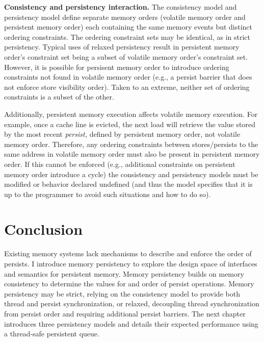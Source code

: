 \textbf{Consistency and persistency interaction.}
The consistency model and persistency model define separate memory orders (volatile memory order and persistent memory order) each containing the same memory events but distinct ordering constraints.
The ordering constraint sets may be identical, as in strict persistency.
Typical uses of relaxed persistency result in persistent memory order's constraint set being a subset of volatile memory order's constraint set.
However, it is possible for persisent memory order to introduce ordering constraints not found in volatile memory order (e.g., a persist barrier that does not enforce store visibility order).
Taken to an extreme, neither set of ordering constraints is a subset of the other.

Additionally, persistent memory execution affects volatile memory execution.
For example, once a cache line is evicted, the next load will retrieve the value stored by the most recent \emph{persist,} defined by persistent memory order, not volatile memory order.
Therefore, any ordering constraints between stores/persists to the same address in volatile memory order must also be present in persistent memory order.
If this cannot be enforced (e.g., additional constraints on persistent memory order introduce a cycle) the consistency and persistency models must be modified or behavior declared undefined (and thus the model specifies that it is up to the programmer to avoid such situations and how to do so).

\section{Conclusion}
\label{sec:Persistency:Conclusion}

Existing memory systems lack mechanisms to describe and enforce the order of persists.
I introduce memory persistency to explore the design space of interfaces and semantics for persistent memory.
Memory persistency builds on memory consistency to determine the values for and order of persist operations.
Memory persistency may be strict, relying on the consistency model to provide both thread and persist synchronization, or relaxed, decoupling thread synchronization from persist order and requiring additional persist barriers.
The next chapter introduces three persistency models and details their expected performance using a thread-safe persistent queue.
